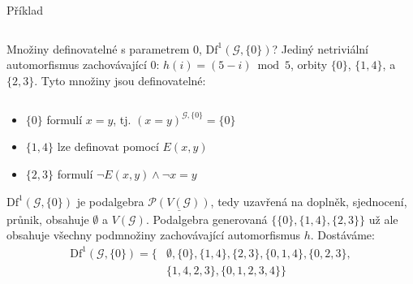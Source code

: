 \documentclass{beamer}
\begin{document}
\begin{frame}{Příklad}

    \vspace{6pt}

    \begin{columns}

        \begin{column}{0.8\textwidth}            
            Množiny definovatelné s parametrem $0$, $\mathrm{Df}^1(\mathcal G,\{0\})$? Jediný netriviální automorfismus zachovávající $0$: \alert{$h(i)=(5-i) \bmod 5$}, orbity $\{0\}$, $\{1,4\}$, a $\{2,3\}$. Tyto množiny jsou definovatelné:            
        \end{column} 

        \begin{column}{0.2\textwidth}            
        \end{column}

    \end{columns}

    \pause
    \begin{itemize}
        \item $\{0\}$ formulí $x=y$, tj. $(x=y)^{\mathcal G,\{0\}}=\{0\}$\pause
        \item $\{1,4\}$ lze definovat pomocí $E(x,y)$\pause
        \item $\{2,3\}$ formulí $\neg E(x,y)\land \neg x=y$\pause
    \end{itemize}
    $\mathrm{Df}^1(\mathcal G,\{0\})$ je podalgebra $\underline{\mathcal P(V(\mathcal G))}$, tedy uzavřená na doplněk, sjednocení, průnik, obsahuje $\emptyset$ a $V(\mathcal G)$. Podalgebra generovaná $\{\{0\},\{1,4\},\{2,3\}\}$ už ale obsahuje všechny podmnožiny zachovávající automorfismus $h$. Dostáváme:\pause
    \begin{align*}        
        \mathrm{Df}^1(\mathcal G,\{0\})=\{&\emptyset, \{0\}, \{1,4\}, \{2,3\}, \{0,1,4\}, \{0,2,3\}, \\ &\{1,4,2,3\}, \{0,1,2,3,4\}\}        
    \end{align*}
    
\end{frame}
\end{document}
